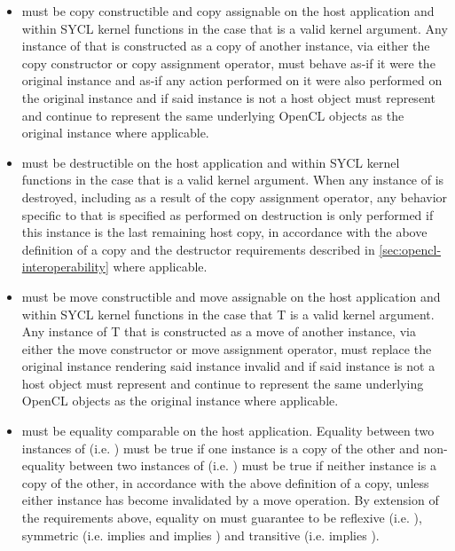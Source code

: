 \begin{itemize}

\item {} must be copy constructible and copy assignable on the host application and within SYCL kernel functions in the case that  is a valid kernel argument. Any instance of  that is constructed as a copy of another instance, via either the copy constructor or copy assignment operator, must behave as-if it were the original instance and as-if any action performed on it were also performed on the original instance and if said instance is not a host object must represent and continue to represent the same underlying OpenCL objects as the original instance where applicable.

\item {} must be destructible on the host application and within SYCL kernel functions in the case that  is a valid kernel argument. When any instance of  is destroyed, including as a result of the copy assignment operator, any behavior specific to  that is specified as performed on destruction is only performed if this instance is the last remaining host copy, in accordance with the above definition of a copy and the destructor requirements described in \ref{sec:opencl-interoperability} where applicable.

\item {} must be move constructible and move assignable on the host application and within SYCL kernel functions in the case that T is a valid kernel argument. Any instance of T that is constructed as a move of another instance, via either the move constructor or move assignment operator, must replace the original instance rendering said instance invalid and if said instance is not a host object must represent and continue to represent the same underlying OpenCL objects as the original instance where applicable.

\item {} must be equality comparable on the host application. Equality between two instances of  (i.e. ) must be true if one instance is a copy of the other and non-equality between two instances of  (i.e. ) must be true if neither instance is a copy of the other, in accordance with the above definition of a copy, unless either instance has become invalidated by a move operation. By extension of the requirements above, equality on  must guarantee to be reflexive (i.e. ), symmetric (i.e.  implies  and  implies ) and transitive (i.e.  implies ).


\end{itemize}
